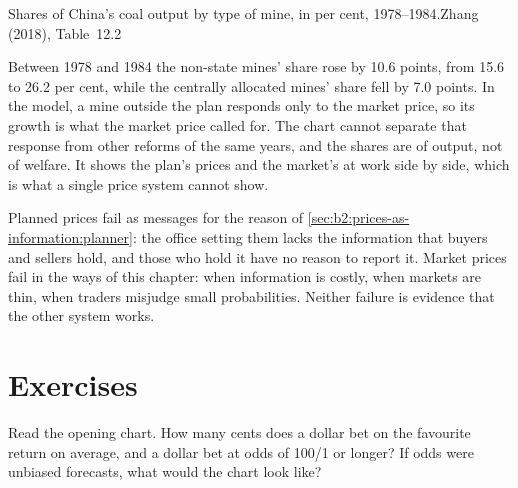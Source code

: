 \begin{omchart}{Shares of China's coal output by type of mine, in per cent, 1978--1984.}{Zhang (2018),
  Table~12.2}
\end{omchart}

Between 1978 and 1984 the non-state mines' share rose by 10.6 points, from 15.6 to 26.2 per cent, while the
centrally allocated mines' share fell by 7.0 points. In the model, a mine outside the plan responds only
to the market price, so its growth is what the market price called for. The chart cannot separate that
response from other reforms of the same years, and the shares are of output, not of welfare. It shows
the plan's prices and the market's at work side by side, which is what a single price system cannot show.

Planned prices fail as messages for the reason of \cref{sec:b2:prices-as-information:planner}: the office
setting them lacks the information that buyers and sellers hold, and those who hold it have no reason to
report it. Market prices fail in the ways of this chapter: when information is costly, when markets are
thin, when traders misjudge small probabilities. Neither failure is evidence that the other system works.

\section{Exercises}\label{sec:b2:prices-as-information:exercises}

\begin{exercise}[$\star$]\label{exo:b2:prices-as-information:1}
Read the opening chart. How many cents does a dollar bet on the favourite return on average, and a dollar
bet at odds of 100/1 or longer? If odds were unbiased forecasts, what would the chart look like?
\end{exercise}

